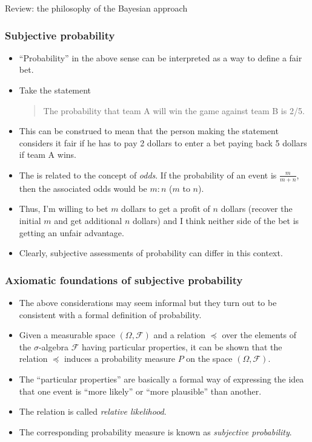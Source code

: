 \documentclass[10pt]{beamer}
\theoremstyle{definition}
\begin{document}
\begin{section}{Review: the philosophy of the Bayesian approach}
\begin{frame}
\frametitle{Subjective probability}
\begin{itemize}\itemsep0.7em
\item ``Probability'' in the above sense can be interpreted as a way to define a fair bet.
\item Take the statement \begin{quote}
The probability that team A will win the game against team B is 2/5.
\end{quote}
\item This can be construed to mean that the person making the statement considers it fair if he has to pay 2 dollars to enter a bet paying back 5 dollars if team A wins.
\item The is related to the concept of \emph{odds}. If the probability of an event is  $\frac{m}{m+n}$, then the associated odds would be $m:n$ ($m$ to $n$).
\item Thus, I'm willing to bet $ m $ dollars to get a profit of $ n $ dollars (recover the initial $ m $ and get additional $ n $ dollars) and I think neither side of the bet is getting an unfair advantage.
\item Clearly, subjective assessments of probability can differ in this context.
\end{itemize}
\end{frame}

\begin{frame}
\frametitle{Axiomatic foundations of subjective probability}
\begin{itemize}\itemsep0.7em
\item The above considerations may seem informal but they turn out to be consistent with a formal definition of probability.
\item Given a measurable space $(\Omega,\mathcal{F})$ and a relation $\preceq$ over the elements of the $\sigma$-algebra $\mathcal{F}$ having particular properties, it can be shown that the relation $\preceq$ induces a probability measure $P$ on the space $(\Omega,\mathcal{F})$.
\item The ``particular properties'' are basically a formal way of expressing the idea that one event is ``more likely'' or ``more plausible'' than another.
\item The relation is called \emph{relative likelihood}.
\item The corresponding probability measure is known as \emph{subjective probability}.
\end{itemize}
\end{frame}


\end{section}
\end{document}
